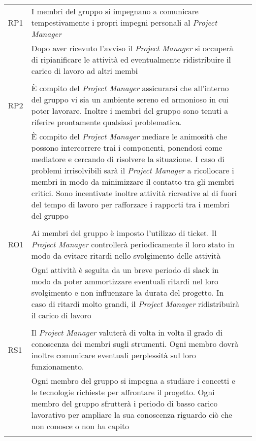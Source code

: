 \begin{table}[H]
\begin{tabular}{l|l|l}
		RP1     & I membri del gruppo si impegnano a comunicare tempestivamente i propri impegni personali al \emph{Project Manager}\\                                                                                                               & Dopo aver ricevuto l'avviso il \emph{Project Manager} si occuperà di ripianificare le attività ed eventualmente ridistribuire il carico di lavoro ad altri membi\\                                                                                                                                                                                                                                                                                                     \\
		RP2     & È compito del \emph{Project Manager} assicurarsi che all'interno del gruppo vi sia un ambiente sereno ed armonioso in cui poter lavorare. Inoltre i membri del gruppo sono tenuti a riferire prontamente qualsiasi problematica.\\ & È compito del \emph{Project Manager} mediare le animosità che possono intercorrere trai i componenti, ponendosi come mediatore e cercando di risolvere la situazione. I caso di problemi irrisolvibili sarà il \emph{Project Manager} a ricollocare i membri in modo da minimizzare il contatto tra gli membri critici. Sono incentivate inoltre attività ricreative al di fuori del tempo di lavoro per rafforzare i rapporti tra i membri del gruppo\\  \\
		RO1     & Ai membri del gruppo è imposto l'utilizzo di ticket. Il \emph{Project Manager} controllerà periodicamente il loro stato in modo da evitare ritardi nello svolgimento delle attività\\                                              & Ogni attività è seguita da un breve periodo di slack in modo da poter ammortizzare eventuali ritardi nel loro svolgimento e non influenzare la durata del progetto. In caso di ritardi molto grandi, il \emph{Project Manager} ridistribuirà il carico di lavoro\\                                                                                                                                                                                                     \\
		RS1     & Il \emph{Project Manager} valuterà di volta in volta il grado di conoscenza dei membri sugli strumenti. Ogni membro dovrà inoltre comunicare eventuali perplessità sul loro funzionamento.\\                                        & Ogni membro del gruppo si impegna a studiare i concetti e le tecnologie richieste per affrontare il progetto. Ogni membro del gruppo sfrutterà i periodo di basso carico lavorativo per ampliare la sua conoscenza riguardo ciò che non conosce o non ha capito\\                                                                                                                                                                                                                    \\

\end{tabular}
\end{table}
